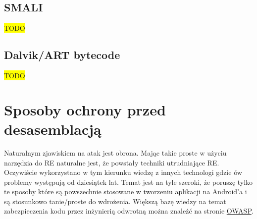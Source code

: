 \documentclass[12pt,a4paper,leqno,oneside,titlepage]{book}
\newcommand{\todo}[1]{\colorbox{yellow}{#1}}
\begin{document}
\section{SMALI}
\label{smali}
\todo{TODO}
\section{Dalvik/ART bytecode}
\todo{TODO}

\chapter{Sposoby ochrony przed desasemblacją}
Naturalnym zjawiskiem na atak jest obrona. Mając takie proste w użyciu narzędzia do RE naturalne jest, że powstały techniki utrudniające RE. Oczywiście wykorzystano w tym kierunku wiedzę z innych technologi gdzie ów problemy występują od dziesiątek lat. Temat jest na tyle szeroki, że poruszę tylko te sposoby które są powszechnie stosowane w tworzeniu aplikacji na Android'a i są stosunkowo tanie/proste do wdrożenia. Większą bazę wiedzy na temat zabezpieczenia kodu przez inżynierią odwrotną można znaleźć na stronie \hyperlink{https://www.owasp.org/index.php/OWASP_Reverse_Engineering_and_Code_Modification_Prevention_Project}{OWASP}.
\end{document}
